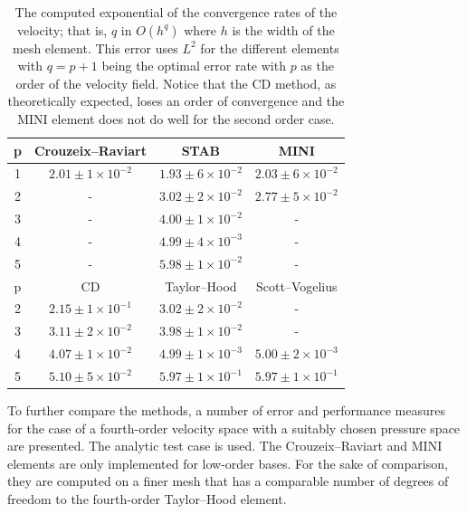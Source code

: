 \begin{table}
  \caption{The computed exponential of the convergence rates of the
  velocity; that is, $q$ in $O(h^q)$ where $h$ is the width of the mesh
  element. This error uses $L^2$ for the different elements with $q=p+1$
  being the optimal error rate with $p$ as the order of the velocity
  field.  Notice that the CD method, as theoretically expected, loses
  an order of convergence and the MINI element does not do well for the
  second order case. }
  \label{tab:terrel:vel_error}
  \begin{center}
  \small
  \begin{tabular}{|c|ccc|}
    \hline
    p  & Crouzeix--Raviart &  STAB &  MINI \\
  \hline
   1 & $2.01\pm 1 \times 10^{-2}$ & $1.93\pm 6 \times 10^{-2}$ & $2.03\pm 6 \times 10^{-2}$ \\
   2 & -                          & $3.02\pm 2 \times 10^{-2}$ & $2.77\pm 5 \times 10^{-2}$ \\
   3 & -                          & $4.00\pm 1 \times 10^{-2}$ & - \\
   4 & -                          & $4.99\pm 4 \times 10^{-3}$ & - \\
   5 & -                          & $5.98\pm 1 \times 10^{-2}$ & -\\
    \hline
    \hline
    p  &  CD  & Taylor--Hood & Scott--Vogelius \\
   \hline
   2 & $2.15 \pm 1 \times 10^{-1}$ & $3.02 \pm 2 \times 10^{-2}$ & -  \\
   3 & $3.11 \pm 2 \times 10^{-2}$ & $3.98 \pm 1 \times 10^{-2}$ & -  \\
   4 & $4.07 \pm 1 \times 10^{-2}$ & $4.99 \pm 1 \times 10^{-3}$ & $5.00 \pm 2 \times 10^{-3}$\\
   5 & $5.10 \pm 5 \times 10^{-2}$ & $5.97 \pm 1 \times 10^{-1}$ & $5.97 \pm 1 \times 10^{-1}$\\
    \hline
   \end{tabular}
  \end{center}
\end{table}

To further compare the methods, a number of error and performance
measures for the case of a fourth-order velocity space with a suitably
chosen pressure space are presented. The analytic test case is used.
The Crouzeix--Raviart and MINI elements are only implemented for low-order
bases. For the sake of comparison, they are computed on a finer mesh
that has a comparable number of degrees of freedom to the fourth-order
Taylor--Hood element.

